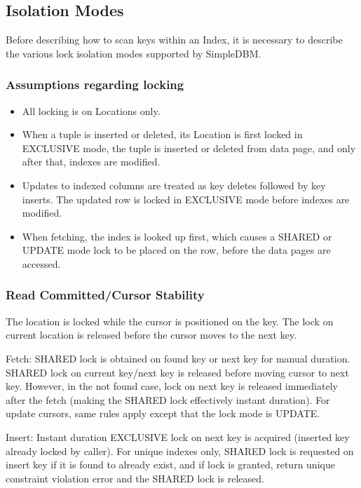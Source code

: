 \documentclass[a4paper,draft,oneside]{book}
\begin{document}
\subsection{Isolation Modes}

Before describing how to scan keys within an Index, it is necessary to
describe the various lock isolation modes supported by SimpleDBM.

\subsubsection{Assumptions regarding locking}

\begin{itemize}
\item All locking is on Locations only. 
\item When a tuple is inserted or deleted, its Location is first locked in EXCLUSIVE mode, the tuple is inserted or deleted from data page, and only after that, indexes are modified. 
\item Updates to indexed columns are treated as key deletes followed by key inserts. The updated row is locked in EXCLUSIVE mode before indexes are modified. 
\item When fetching, the index is looked up first, which causes a SHARED or UPDATE mode lock to be placed on the row, before the data pages are accessed.
\end{itemize}

\subsubsection{Read Committed/Cursor Stability}

The location is locked while the cursor is positioned on the key. The lock on current location is
released before the cursor moves to the next key.

Fetch: SHARED lock is obtained on found key or next key for manual duration. SHARED lock on current key/next key is released before moving cursor to next key. However, in the not found case, lock on next key is released immediately after the fetch (making the SHARED lock effectively instant duration). For update cursors, same rules apply except that the lock mode is UPDATE. 

Insert: Instant duration EXCLUSIVE lock on next key is acquired (inserted key already locked by caller). For unique indexes only, SHARED lock is requested on insert key if it is found to already exist, and if lock is granted, return unique constraint violation error and the SHARED lock is released. 
\end{document}
